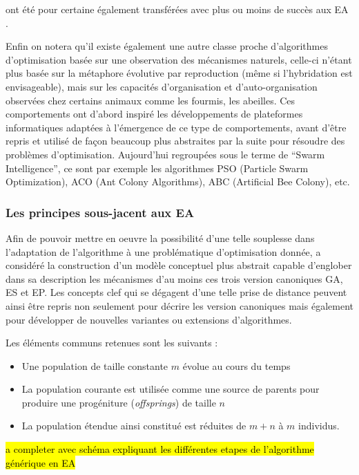 ont été pour certaine également transférées avec plus ou moins de succès aux EA \textcite[171-237]{Deb2001}.

Enfin on notera qu'il existe également une autre classe proche d'algorithmes d'optimisation basée sur une observation des mécanismes naturels, celle-ci n'étant plus basée sur la métaphore évolutive par reproduction (même si l'hybridation est envisageable), mais sur les capacités d'organisation et d'auto-organisation observées chez certains animaux comme les fourmis, les abeilles. Ces comportements ont d'abord inspiré les développements de plateformes informatiques adaptées à l'émergence de ce type de comportements, avant d'être repris et utilisé de façon beaucoup plus abstraites par la suite pour résoudre des problèmes d'optimisation. Aujourd'hui regroupées sous le terme de \foreignquote{english}{Swarm Intelligence}, ce sont par exemple les algorithmes PSO (Particle Swarm Optimization), ACO (Ant Colony Algorithms), ABC (Artificial Bee Colony), etc.

\subsubsection{Les principes sous-jacent aux EA}
\label{ssec:principesEA}

Afin de pouvoir mettre en oeuvre la possibilité d'une telle souplesse dans l'adaptation de l'algorithme à une problématique d'optimisation donnée, \textcite[49]{DeJong2006a} a considéré la construction d'un modèle conceptuel plus abstrait capable d'englober dans sa description les mécanismes d'au moins ces trois version canoniques GA, ES et EP. Les concepts clef qui se dégagent d'une telle prise de distance peuvent ainsi être repris non seulement pour décrire les version canoniques mais également pour développer de nouvelles variantes ou extensions d'algorithmes.

Les éléments communs retenues sont les suivants :

\begin{itemize}
\item Une population de taille constante $m$ évolue au cours du temps
\item La population courante est utilisée comme une source de parents pour produire une progéniture (\textit{offsprings}) de taille $n$
\item La population étendue ainsi constitué est réduites de $m + n$ à $m$ individus.
\end{itemize}

\hl{a completer avec schéma expliquant les différentes etapes de l'algorithme générique en EA}

